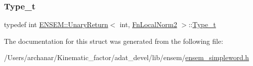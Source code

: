 \mbox{\label{structENSEM_1_1UnaryReturn_3_01int_00_01FnLocalNorm2_01_4_aaa78b86bca8291361ec04d107d900df8}} 
\subsubsection{\texorpdfstring{Type\_t}{Type\_t}\hspace{0.1cm}{\footnotesize\ttfamily [2/2]}}
{\footnotesize\ttfamily typedef int \mbox{\hyperlink{structENSEM_1_1UnaryReturn}{E\+N\+S\+E\+M\+::\+Unary\+Return}}$<$ int, \mbox{\hyperlink{structENSEM_1_1FnLocalNorm2}{Fn\+Local\+Norm2}} $>$\+::\mbox{\hyperlink{structENSEM_1_1UnaryReturn_3_01int_00_01FnLocalNorm2_01_4_aaa78b86bca8291361ec04d107d900df8}{Type\+\_\+t}}}



The documentation for this struct was generated from the following file\+:\begin{DoxyCompactItemize}
\item 
/\+Users/archanar/\+Kinematic\+\_\+factor/adat\+\_\+devel/lib/ensem/\mbox{\hyperlink{lib_2ensem_2ensem__simpleword_8h}{ensem\+\_\+simpleword.\+h}}\end{DoxyCompactItemize}
